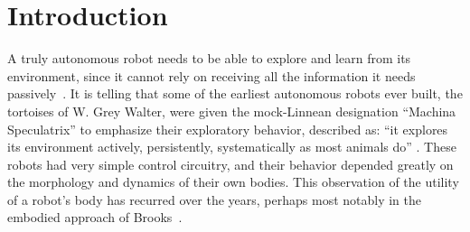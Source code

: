 
\section{Introduction}

A truly autonomous robot needs to be able to explore and learn from
its environment, since it cannot rely on receiving all the information
it needs passively~\cite{whaite97autonomous}.
It is telling that some of the earliest autonomous robots ever built,
the tortoises of W. Grey Walter, were given the mock-Linnean
designation ``Machina Speculatrix'' to emphasize their exploratory
behavior, described as: ``it explores its environment actively,
persistently, systematically as most animals do''
\cite{walter50imitation}.
These robots had very simple control circuitry, and their behavior
depended greatly on the morphology and dynamics of their own bodies.
%
This observation of the utility of a robot's body has recurred over
the years, perhaps most notably in the embodied approach of 
Brooks~\cite{group-AAAI-98}.



